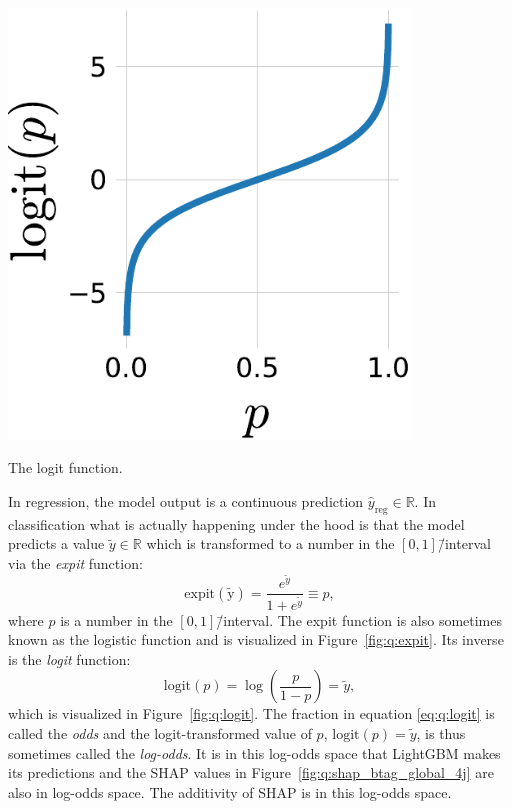 \begin{marginfigure}
  \centerfloat
  \includegraphics[width=0.8\textwidth]{figures/logit_expit/logit.pdf}
  \caption[The logit Function]
          {The logit function.} 
  \label{fig:q:logit}
\end{marginfigure}

In regression, the model output is a continuous prediction ${\hat{y}_\mathrm{reg} \in \mathbb{R}}$. In classification what is actually happening under the hood is that the model predicts a value $\tilde{y} \in \mathbb{R}$ which is transformed to a number in the $[0, 1]$\=/interval via the \emph{expit} function:
\begin{equation}
    \label{eq:q:expit}
    \mathrm{expit(\tilde{y})} = \frac{e^{\tilde{y}}}{1+e^{\tilde{y}}} \equiv p,
\end{equation}
where $p$ is a number in the $[0, 1]$\=/interval. The expit function is also sometimes known as the logistic function and is visualized in Figure~\ref{fig:q:expit}. Its inverse is the \emph{logit} function:
\begin{equation}
  \label{eq:q:logit}
  \mathrm{logit}(p) = \log \left( \frac{p}{1-p}  \right) = \tilde{y},
\end{equation}
 which is visualized in Figure~\ref{fig:q:logit}. The fraction in equation \eqref{eq:q:logit} is called the \emph{odds} and the logit-transformed value of $p$, $\mathrm{logit}(p)=\tilde{y}$, is thus sometimes called the \emph{log-odds}. It is in this log-odds space that LightGBM makes its predictions and the SHAP values in Figure~\ref{fig:q:shap_btag_global_4j} are also in log-odds space. The additivity of SHAP is in this log-odds space. 


